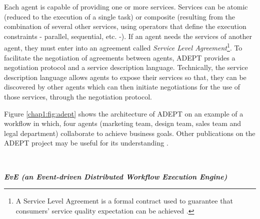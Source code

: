 Each agent is capable of providing one or more services. Services can be atomic (reduced to the execution of a single task) or composite (resulting from the combination of several other services, using operators that define the execution constraints - parallel, sequential, etc. -). If an agent needs the services of another agent, they must enter into an agreement called \textit{Service Level Agreement}\footnote{A Service Level Agreement is a formal contract used to guarantee that consumers' service quality expectation can be achieved \cite{wu2012service}.}. To facilitate the negotiation of agreements between agents, ADEPT provides a negotiation protocol and a service description language. Technically, the service description language allows agents to expose their services so that, they can be discovered by other agents which can then initiate negotiations for the use of those services, through the negotiation protocol.

Figure \ref{chap1:fig:adept} shows the architecture of ADEPT on an example of a workflow in which, four agents (marketing team, design team, sales team and legal department) collaborate to achieve business goals. Other publications on the ADEPT project may be useful for its understanding \cite{reichert1998adept, dadam2000clinical, reichert2003adept}.

~

\noindent\textbf{\textit{EvE (an Event-driven Distributed Workflow Execution Engine) \cite{eve}}}

